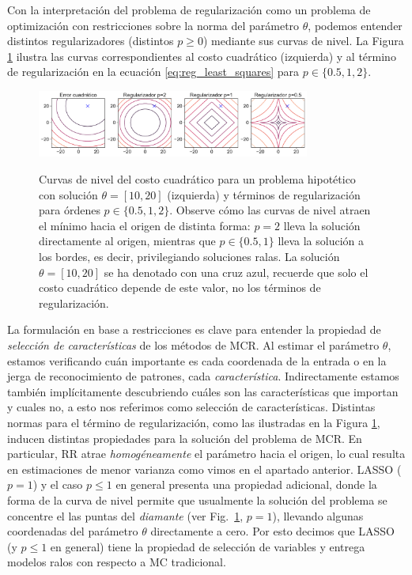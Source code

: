 Con la interpretación del problema de regularización como un problema de optimización con restricciones sobre la norma del parámetro $\theta$, podemos entender distintos regularizadores (distintos $p\geq0$) mediante sus curvas de nivel. La Figura \ref{fig:reg_lin_reg} ilustra las curvas correspondientes al costo cuadrático (izquierda) y al término de regularización en la ecuación \eqref{eq:reg_least_squares} para $p\in\{0.5,1,2\}$. 

\begin{figure}[H]
	\centering
	\includegraphics[width=0.8\textwidth]{img/cap2_regularizadores.pdf}\\
	\caption{Curvas de nivel del costo cuadrático para un problema hipotético con solución $\theta=[10,20]$ (izquierda) y términos de regularización para órdenes $p\in\{0.5,1,2\}$. Observe cómo las curvas de nivel atraen el mínimo hacia el origen de distinta forma: $p=2$ lleva la solución directamente al origen, mientras que $p\in\{0.5,1\}$ lleva la solución a los bordes, es  decir, privilegiando soluciones ralas. La solución $\theta=[10,20]$ se ha denotado con una cruz azul, recuerde que solo el costo cuadrático depende de este valor, no los términos de regularización. }
	\label{fig:reg_lin_reg}  
\end{figure}

La formulación en base a restricciones es clave para entender la propiedad de \emph{selección de características} de los métodos de MCR. Al estimar el parámetro $\theta$, estamos verificando cuán importante es cada coordenada de la entrada o en la jerga de reconocimiento de patrones, cada \emph{característica}. Indirectamente estamos también implícitamente descubriendo cuáles son las características que importan y cuales no, a esto nos referimos como selección de características. Distintas normas para el término de regularización, como las ilustradas en la Figura \ref{fig:reg_lin_reg}, inducen distintas propiedades para la solución del problema de MCR. En particular, RR atrae \emph{homogéneamente} el parámetro hacia el origen, lo cual resulta  en estimaciones de menor varianza como vimos en el apartado anterior. LASSO ($p=1$) y el caso $p\leq1$ en general presenta una propiedad adicional, donde la forma de la curva de nivel permite que usualmente la solución del problema se concentre el las puntas del \emph{diamante} (ver Fig.~\ref{fig:reg_lin_reg}, $p=1$), llevando algunas coordenadas del parámetro $\theta$ directamente a cero. Por esto decimos que LASSO (y $p\leq1$ en general) tiene la propiedad de selección de variables y entrega modelos ralos con respecto a MC tradicional. \\


